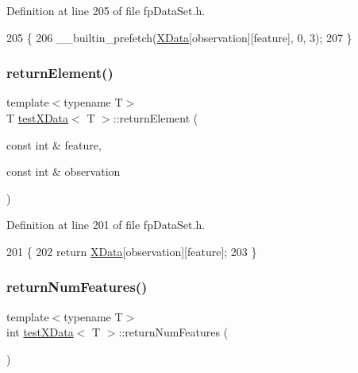 Definition at line 205 of file fp\+Data\+Set.\+h.


\begin{DoxyCode}
205                                                                       \{
206                             \_\_builtin\_prefetch(\hyperlink{classtestXData_aabb02eb5f97c674d6a88c8194498b621}{XData}[observation][feature], 0, 3);
207         \}
\end{DoxyCode}
\mbox{\label{classtestXData_ac26a03abde5b65053944ff9f6eec00b6}} 
\subsubsection{\texorpdfstring{return\+Element()}{returnElement()}}
{\footnotesize\ttfamily template$<$typename T$>$ \\
T \hyperlink{classtestXData}{test\+X\+Data}$<$ T $>$\+::return\+Element (\begin{DoxyParamCaption}\item[{const int \&}]{feature,  }\item[{const int \&}]{observation }\end{DoxyParamCaption})\hspace{0.3cm}{\ttfamily [inline]}}



Definition at line 201 of file fp\+Data\+Set.\+h.


\begin{DoxyCode}
201                                                                          \{
202             \textcolor{keywordflow}{return} \hyperlink{classtestXData_aabb02eb5f97c674d6a88c8194498b621}{XData}[observation][feature];
203         \}
\end{DoxyCode}
\mbox{\label{classtestXData_a81de09b65cf32fc0aa728ac48b881b64}} 
\subsubsection{\texorpdfstring{return\+Num\+Features()}{returnNumFeatures()}}
{\footnotesize\ttfamily template$<$typename T$>$ \\
int \hyperlink{classtestXData}{test\+X\+Data}$<$ T $>$\+::return\+Num\+Features (\begin{DoxyParamCaption}{ }\end{DoxyParamCaption})\hspace{0.3cm}{\ttfamily [inline]}}



